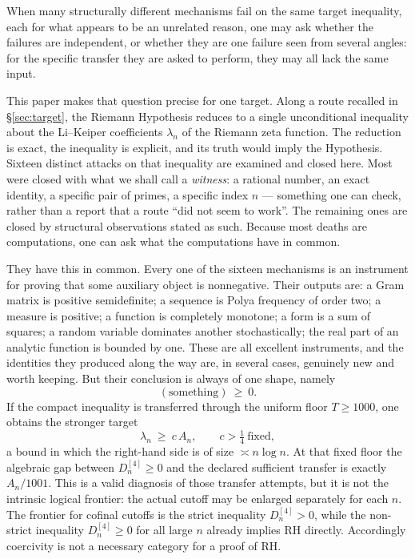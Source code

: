 \documentclass[11pt]{amsart}
\theoremstyle{definition}
\theoremstyle{remark}
\theoremstyle{definition}
\begin{document}
When many structurally different mechanisms fail on the same target inequality, each for what
appears to be an unrelated reason, one may ask whether the failures are independent, or whether
they are one failure seen from several angles: for the specific transfer they are asked to
perform, they may all lack the same input.

This paper makes that question precise for one target. Along a route recalled in
\S\ref{sec:target}, the Riemann Hypothesis reduces to a single unconditional inequality about
the Li--Keiper coefficients $\lambda_n$ of the Riemann zeta function. The reduction is exact,
the inequality is explicit, and its truth would imply the Hypothesis. Sixteen distinct attacks
on that inequality are examined and closed here. Most were closed with what we shall call a
\emph{witness}: a rational number, an exact identity, a specific pair of primes, a specific
index $n$ --- something one can check, rather than a report that a route ``did not seem to
work''. The remaining ones are closed by structural observations stated as such. Because most
deaths are computations, one can ask what the computations have in common.

They have this in common. Every one of the sixteen mechanisms is an instrument for proving that
some auxiliary object is nonnegative. Their outputs are: a Gram matrix is positive semidefinite; a
sequence is Polya frequency of order two; a measure is positive; a function is completely
monotone; a form is a sum of squares; a random variable dominates another stochastically; the
real part of an analytic function is bounded by one. These are all excellent instruments, and
the identities they produced along the way are, in several cases, genuinely new and worth
keeping. But their conclusion is always of one shape, namely
\[
   (\text{something})\ \ge\ 0 .
\]
If the compact inequality is transferred through the uniform floor $T\ge1000$, one obtains the
stronger target
\[
   \lambda_n\ \ge\ c\,A_n,\qquad c>\tfrac14\ \text{fixed},
\]
a bound in which the right-hand side is of size $\asymp n\log n$.  At that fixed floor the
algebraic gap between $D_n^{[4]}\ge0$ and the declared sufficient transfer is exactly
$A_n/1001$.  This is a valid diagnosis of those transfer attempts, but it is not the intrinsic
logical frontier: the actual cutoff may be enlarged separately for each $n$.  The
frontier for cofinal cutoffs is the strict inequality $D_n^{[4]}>0$, while the non-strict
inequality $D_n^{[4]}\ge0$ for all large $n$ already implies RH directly.  Accordingly
coercivity is not a necessary category for a proof of RH.
\end{document}
